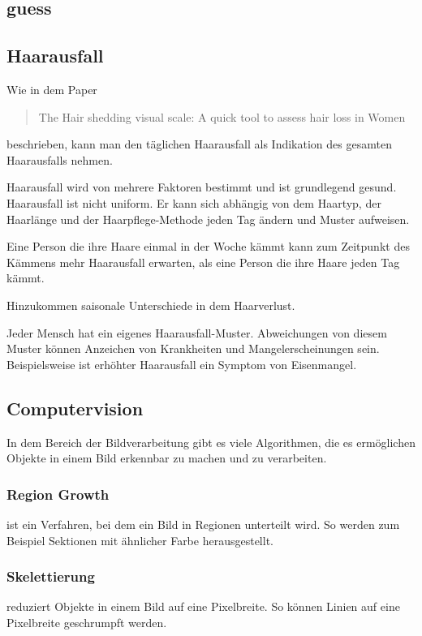 \documentclass[german,a4paper,12pt]{llncs}
\begin{document}
\subsection{guess}





\subsection{Haarausfall}
Wie in dem Paper \blockquote{The Hair shedding visual scale: A quick tool to assess hair loss in Women} beschrieben, kann man den täglichen Haarausfall als Indikation des gesamten Haarausfalls nehmen.\cite{visualScale}

Haarausfall wird von mehrere Faktoren bestimmt und ist grundlegend gesund. Haarausfall ist nicht uniform. Er kann sich abhängig von dem Haartyp, der Haarlänge und der Haarpflege-Methode jeden Tag ändern und Muster aufweisen. 

Eine Person die ihre Haare einmal in der Woche kämmt kann zum Zeitpunkt des Kämmens mehr Haarausfall erwarten, als eine Person die ihre Haare jeden Tag kämmt. 

Hinzukommen saisonale Unterschiede in dem Haarverlust.\cite{seasoalShedding}

Jeder Mensch hat ein eigenes Haarausfall-Muster. Abweichungen von diesem Muster können Anzeichen von Krankheiten und Mangelerscheinungen sein. Beispielsweise ist erhöhter Haarausfall ein Symptom von Eisenmangel.\cite{ironDeficiency}

\subsection{Computervision}
In dem Bereich der Bildverarbeitung gibt es viele Algorithmen, die es ermöglichen Objekte in einem Bild erkennbar zu machen und zu verarbeiten.

\subsubsection{Region Growth}
ist ein Verfahren, bei dem ein Bild in Regionen unterteilt wird. So werden zum Beispiel Sektionen mit ähnlicher Farbe herausgestellt. 

\subsubsection{Skelettierung}
reduziert Objekte in einem Bild auf eine Pixelbreite. So können Linien auf eine Pixelbreite geschrumpft werden.
\end{document}

